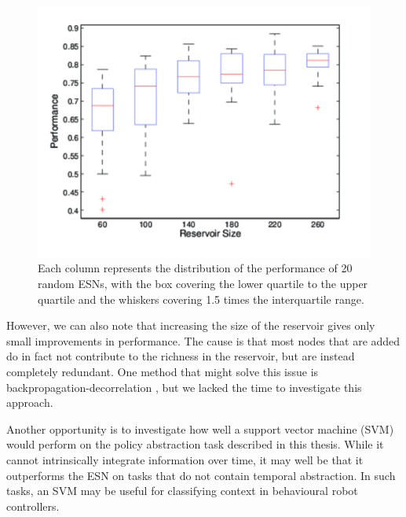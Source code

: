 \documentclass[10pt,a4paper]{report}
\begin{document}
\begin{figure}[bthp]
\includegraphics[width=\textwidth]{figures/3levels.png}
\caption{Each column represents the distribution of the performance of 20 random ESNs, with the box covering the lower quartile to the upper quartile and the whiskers covering 1.5 times the interquartile range.}
\label{3levels}
\end{figure}

However, we can also note that increasing the size of the reservoir gives only small improvements in performance. The cause is that most nodes that are added do in fact not contribute to the richness in the reservoir, but are instead completely redundant. One method that might solve this issue is backpropagation-decorrelation \citep{Steil2004, Steil2007}, but we lacked the time to investigate this approach.

Another opportunity is to investigate how well a support vector machine (SVM) would perform on the policy abstraction task described in this thesis. While it cannot intrinsically integrate information over time, it may well be that it outperforms the ESN on tasks that do not contain temporal abstraction. In such tasks, an SVM may be useful for classifying context in behavioural robot controllers. 
\end{document}
